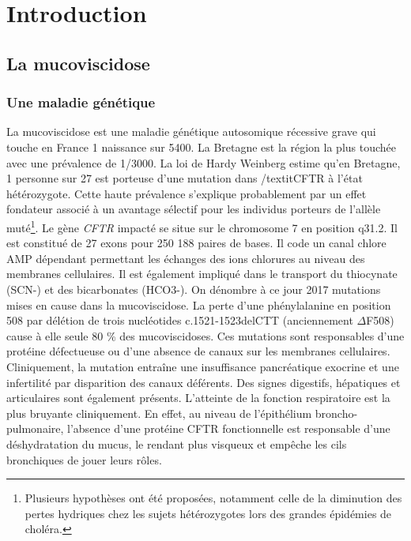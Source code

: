\documentclass[12pt,a4paper]{article}
\begin{document}
\newpage

\setcounter{page}{1}

\section{Introduction}
\subsection{La mucoviscidose}
\subsubsection{Une maladie génétique}
La mucoviscidose est une maladie génétique autosomique récessive grave qui touche en France 1 naissance sur 5400\cite{Registredelamuco.org}. La Bretagne est la région la plus touchée avec une prévalence de 1/3000\cite{Registredelamuco.org}.
La loi de Hardy Weinberg estime qu’en Bretagne, 1 personne sur 27 est porteuse d'une mutation dans /textit{CFTR} à l’état hétérozygote. Cette haute prévalence s’explique probablement par un effet fondateur associé à un avantage sélectif pour les individus porteurs de l’allèle muté\footnote{Plusieurs hypothèses ont été proposées, notamment celle de la diminution des pertes hydriques chez les sujets hétérozygotes lors des grandes épidémies de choléra.}.
Le gène \textit{CFTR} impacté se situe sur le chromosome 7 en position q31.2. Il est constitué de 27 exons pour 250 188\cite{OLeary2016} paires de bases. Il code un canal chlore AMP dépendant permettant les échanges des ions chlorures au niveau des membranes cellulaires. Il est également impliqué dans le transport du thiocynate (SCN-) et des bicarbonates (HCO3-)\cite{Quinton2001}.
On dénombre à ce jour 2017 mutations \cite{cftrdb} mises en cause dans la mucoviscidose. La perte d’une phénylalanine en position 508 par délétion de trois nucléotides c.1521-1523delCTT (anciennement $\Delta$F508) cause à elle seule 80 \% des mucoviscidoses\cite{cftrdb}.
Ces mutations sont responsables d’une protéine défectueuse ou d’une absence de canaux sur les membranes cellulaires. \\
Cliniquement, la mutation entraîne une insuffisance pancréatique exocrine et une infertilité par disparition des canaux déférents. Des signes digestifs, hépatiques et articulaires sont également présents.
L'atteinte de la fonction respiratoire est la plus bruyante cliniquement. En effet, au niveau de l’épithélium broncho-pulmonaire, l’absence d’une protéine CFTR fonctionnelle est responsable d’une déshydratation du mucus, le rendant plus visqueux et empêche les cils bronchiques de jouer leurs rôles.\\
\end{document}
